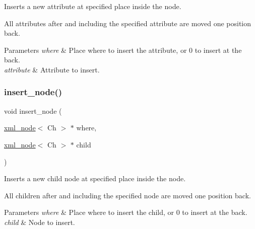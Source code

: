 Inserts a new attribute at specified place inside the node. 

All attributes after and including the specified attribute are moved one position back. 
\begin{DoxyParams}{Parameters}
{\em where} & Place where to insert the attribute, or 0 to insert at the back. \\
\hline
{\em attribute} & Attribute to insert. \\
\hline
\end{DoxyParams}
\mbox{\label{classrapidxml_1_1xml__node_a780972a57fc447250ab47cc8f421b65e}} 
\subsubsection{\texorpdfstring{insert\+\_\+node()}{insert\_node()}}
{\footnotesize\ttfamily void insert\+\_\+node (\begin{DoxyParamCaption}\item[{\mbox{\hyperlink{classrapidxml_1_1xml__node}{xml\+\_\+node}}$<$ Ch $>$ $\ast$}]{where,  }\item[{\mbox{\hyperlink{classrapidxml_1_1xml__node}{xml\+\_\+node}}$<$ Ch $>$ $\ast$}]{child }\end{DoxyParamCaption})\hspace{0.3cm}{\ttfamily [inline]}}



Inserts a new child node at specified place inside the node. 

All children after and including the specified node are moved one position back. 
\begin{DoxyParams}{Parameters}
{\em where} & Place where to insert the child, or 0 to insert at the back. \\
\hline
{\em child} & Node to insert. \\
\hline
\end{DoxyParams}
\mbox{\label{classrapidxml_1_1xml__node_aac6275f8fc7ce79f9a7732240cf1428c}} 
